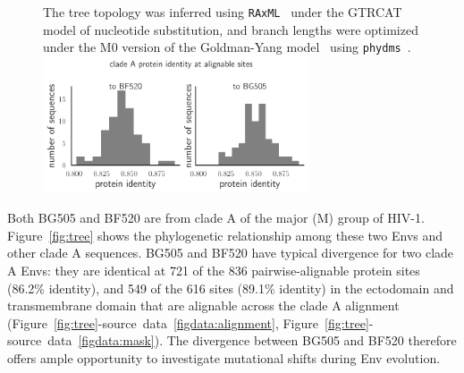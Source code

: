 \documentclass[9pt]{elife}
\begin{document}
\begin{figure}
{The tree topology was inferred using \texttt{RAxML}~\citep{stamatakis2014raxml} under the GTRCAT model of nucleotide substitution, and branch lengths were optimized under the M0 version of the Goldman-Yang model~\citep{yang2000codon} using \texttt{phydms}~\citep{hilton2017phydms}.
}
{\includegraphics[width=0.7\textwidth]{figures/masked_alignment_identity.pdf}}
\end{figure}

Both BG505 and BF520 are from clade A of the major (M) group of HIV-1.
Figure~\ref{fig:tree} shows the phylogenetic relationship among these two Envs and other clade A sequences.
BG505 and BF520 have typical divergence for two clade A Envs: they are identical at 721 of the 836 pairwise-alignable protein sites (86.2\% identity), and 549 of the 616 sites (89.1\% identity) in the ectodomain and transmembrane domain that are alignable across the clade A alignment (Figure~\ref{fig:tree}-source~data~\ref{figdata:alignment}, Figure~\ref{fig:tree}-source~data~\ref{figdata:mask}).
The divergence between BG505 and BF520 therefore offers ample opportunity to investigate mutational shifts during Env evolution.
\end{document}
